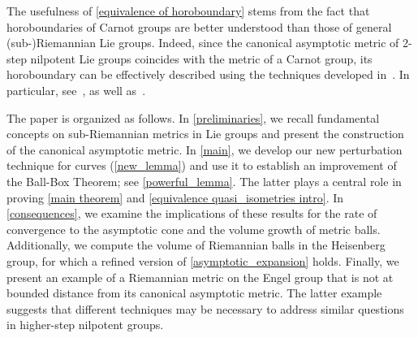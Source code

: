 \documentclass[a4paper,11pt,reqno]{amsart}
\theoremstyle{plain}
\newtheorem{corollary}[theorem]{Corollary}
\theoremstyle{definition}
\begin{document}
The usefulness of \cref{equivalence of horoboundary} stems from the fact that horoboundaries of Carnot groups are better understood than those of general (sub-)Riemannian Lie groups. Indeed, since the canonical asymptotic metric of $2$-step nilpotent Lie groups coincides with the metric of a Carnot group, its horoboundary can be effectively described using the techniques developed in~\cite{MR4237371}. In particular, see~\cite[Sections 2.6 and 3.3]{MR4237371}, as well as~\cite{fisher2024metricboundarytheorycarnot}.




The paper is organized as follows. In \cref{preliminaries}, we recall fundamental concepts on sub-Riemannian metrics in Lie groups and present the construction of the canonical asymptotic metric. In \cref{main}, we develop our new perturbation technique for curves (\cref{new_lemma}) and use it to establish an improvement of the Ball-Box Theorem; see \cref{powerful_lemma}. The latter plays a central role in proving \cref{main theorem} and \cref{equivalence quasi_isometries intro}. In \cref{consequences}, we examine the implications of these results for the rate of convergence to the asymptotic cone and the volume growth of metric balls. Additionally, we compute the volume of Riemannian balls in the Heisenberg group, for which a refined version of \eqref{asymptotic_expansion} holds.
Finally, we present an example of a Riemannian metric on the Engel group that is not at bounded distance from its canonical asymptotic metric. The latter example suggests that different techniques may be necessary to address similar questions in higher-step nilpotent groups.
\end{document}
